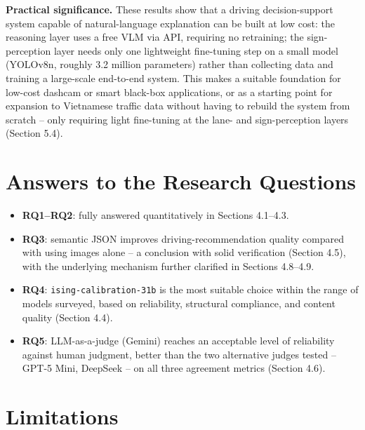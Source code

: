 \documentclass[12pt,a4paper]{report}
\begin{document}
\textbf{Practical significance.} These results show that a driving decision-support system capable of natural-language explanation can be built at low cost: the reasoning layer uses a free VLM via API, requiring no retraining; the sign-perception layer needs only one lightweight fine-tuning step on a small model (YOLOv8n, roughly 3.2 million parameters) rather than collecting data and training a large-scale end-to-end system. This makes a suitable foundation for low-cost dashcam or smart black-box applications, or as a starting point for expansion to Vietnamese traffic data without having to rebuild the system from scratch -- only requiring light fine-tuning at the lane- and sign-perception layers (Section 5.4).

\section{Answers to the Research Questions}

\begin{itemize}
    \item \textbf{RQ1--RQ2}: fully answered quantitatively in Sections 4.1--4.3.
    \item \textbf{RQ3}: semantic JSON improves driving-recommendation quality compared with using images alone -- a conclusion with solid verification (Section 4.5), with the underlying mechanism further clarified in Sections 4.8--4.9.
    \item \textbf{RQ4}: \texttt{ising-calibration-31b} is the most suitable choice within the range of models surveyed, based on reliability, structural compliance, and content quality (Section 4.4).
    \item \textbf{RQ5}: LLM-as-a-judge (Gemini) reaches an acceptable level of reliability against human judgment, better than the two alternative judges tested -- GPT-5 Mini, DeepSeek -- on all three agreement metrics (Section 4.6).
\end{itemize}

\section{Limitations}
\end{document}
